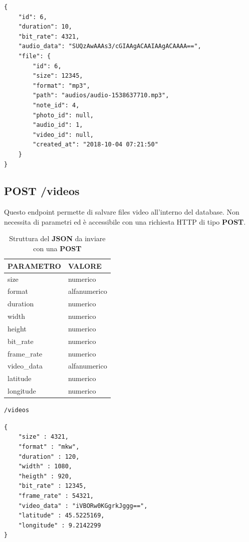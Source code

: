 \begin{lstlisting}[caption=Esempio \textbf{JSON} restituito]
{
	"id": 6,
	"duration": 10,
	"bit_rate": 4321,
	"audio_data": "SUQzAwAAAs3/cGIAAgACAAIAAgACAAAA==",
	"file": {
		"id": 6,
		"size": 12345,
		"format": "mp3",
		"path": "audios/audio-1538637710.mp3",
		"note_id": 4,
		"photo_id": null,
		"audio_id": 1,
		"video_id": null,
		"created_at": "2018-10-04 07:21:50"
	}
}
\end{lstlisting}

\subsection{POST /videos}
Questo endpoint permette di salvare files video all'interno del database. Non necessita di parametri ed è accessibile con una richiesta HTTP di tipo \textbf{POST}.

\begin{table}[!h]
	\centering
	\begin{tabular}{@{}ll@{}}
		\toprule
		\textbf{PARAMETRO} & \textbf{VALORE}  \\ \midrule
		size               & numerico\\ 
		format             & alfanumerico\\
		duration           & numerico\\
		width              & numerico\\
		height             & numerico\\
		bit\_rate          & numerico\\
		frame\_rate        & numerico\\
		video\_data        & alfanumerico\\
		latitude           & numerico\\ 
		longitude          & numerico\\ \bottomrule		
	\end{tabular}
\caption{Struttura del \textbf{JSON} da inviare con una \textbf{POST}}
\end{table}

\begin{lstlisting}[caption=Esempio di richiesta \textbf{POST}, xleftmargin=.26\textwidth, xrightmargin=.26\textwidth]
	   /videos	
\end{lstlisting}

\begin{lstlisting}[caption=Esempio \textbf{JSON} da inviare]
{
	"size" : 4321,
	"format" : "mkw",
	"duration" : 120,
	"width" : 1080,
	"heigth" : 920,
	"bit_rate" : 12345,
	"frame_rate" : 54321,
	"video_data" : "iVBORw0KGgrkJggg==",    
	"latitude" : 45.5225169,
	"longitude" : 9.2142299
}
\end{lstlisting}

